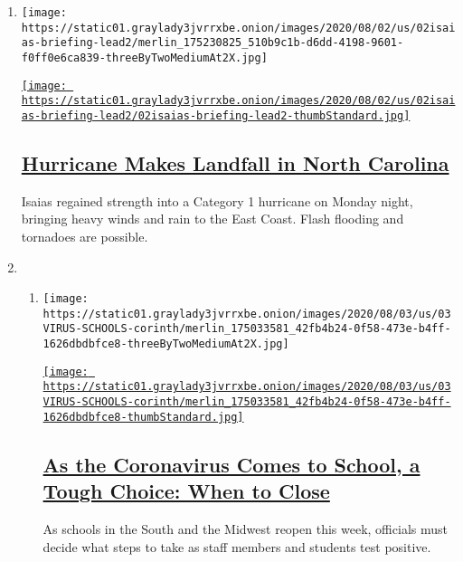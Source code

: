 \begin{enumerate}
\def\labelenumi{\arabic{enumi}.}
\item
  \texttt{[image: https://static01.graylady3jvrrxbe.onion/images/2020/08/02/us/02isaias-briefing-lead2/merlin\_175230825\_510b9c1b-d6dd-4198-9601-f0ff0e6ca839-threeByTwoMediumAt2X.jpg]}

  \href{/2020/08/03/us/isaias-storm-updates.html}{\texttt{[image: https://static01.graylady3jvrrxbe.onion/images/2020/08/02/us/02isaias-briefing-lead2/02isaias-briefing-lead2-thumbStandard.jpg]}}

  \hypertarget{hurricane-makes-landfall-in-north-carolina}{%
  \subsection{\texorpdfstring{\href{/2020/08/03/us/isaias-storm-updates.html}{Hurricane
  Makes Landfall in North
  Carolina}}{Hurricane Makes Landfall in North Carolina}}\label{hurricane-makes-landfall-in-north-carolina}}

  Isaias regained strength into a Category 1 hurricane on Monday night,
  bringing heavy winds and rain to the East Coast. Flash flooding and
  tornadoes are possible.
\item
  \begin{enumerate}
  \def\labelenumii{\arabic{enumii}.}
  \item
    \texttt{[image: https://static01.graylady3jvrrxbe.onion/images/2020/08/03/us/03VIRUS-SCHOOLS-corinth/merlin\_175033581\_42fb4b24-0f58-473e-b4ff-1626dbdbfce8-threeByTwoMediumAt2X.jpg]}

    \href{/2020/08/03/us/school-closing-coronavirus.html}{\texttt{[image: https://static01.graylady3jvrrxbe.onion/images/2020/08/03/us/03VIRUS-SCHOOLS-corinth/merlin\_175033581\_42fb4b24-0f58-473e-b4ff-1626dbdbfce8-thumbStandard.jpg]}}

    \hypertarget{as-the-coronavirus-comes-to-school-a-tough-choice-when-to-close}{%
    \subsection{\texorpdfstring{\href{/2020/08/03/us/school-closing-coronavirus.html}{As
    the Coronavirus Comes to School, a Tough Choice: When to
    Close}}{As the Coronavirus Comes to School, a Tough Choice: When to Close}}\label{as-the-coronavirus-comes-to-school-a-tough-choice-when-to-close}}

    As schools in the South and the Midwest reopen this week, officials
    must decide what steps to take as staff members and students test
    positive.


\end{enumerate}
\end{enumerate}
